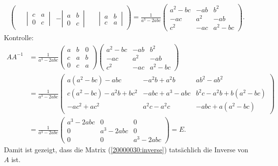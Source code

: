 \begin{loesung}
\begin{align}
\begin{pmatrix}
			\\[13pt]
\phantom{-}\left|\,\begin{matrix}c&a\\0&c\end{matrix}\,\right|
	&-\left|\,\begin{matrix}a&b\\0&c\end{matrix}\,\right|
		&\phantom{-}\left|\,\begin{matrix}a&b\\c&a\end{matrix}\,\right|
\end{pmatrix}
=
\frac1{a^3-2abc}\begin{pmatrix}
a^2-bc&-ab&b^2\\
-ac&a^2&-ab\\
c^2&-ac&a^2-bc
\end{pmatrix}.
\label{20000030:inverse}
\end{align}
Kontrolle:
\begin{align*}
AA^{-1}
&=
\frac1{a^3-2abc}
\begin{pmatrix}
a&b&0\\
c&a&b\\
0&c&a
\end{pmatrix}
\begin{pmatrix}
a^2-bc&-ab&b^2\\
-ac&a^2&-ab\\
c^2&-ac&a^2-bc
\end{pmatrix}
\\
&=
\frac1{a^3-2abc}
\begin{pmatrix}
a(a^2-bc)-abc      &-a^2b+a^2b  &ab^2-ab^2          \\
c(a^2-bc)-a^2b+bc^2&-abc+a^3-abc&b^2c-a^2b+b(a^2-bc)\\
-ac^2+ac^2         &a^2c-a^2c   &-abc+a(a^2-bc)
\end{pmatrix}
\\
&=
\frac1{a^3-2abc}
\begin{pmatrix}
a^3-2abc&0&0\\
0&a^3-2abc&0\\
0&0&a^3-2abc
\end{pmatrix}
=E.
\end{align*}
Damit ist gezeigt, dass die Matrix (\ref{20000030:inverse}) tatsächlich
die Inverse von $A$ ist.
\end{loesung}

